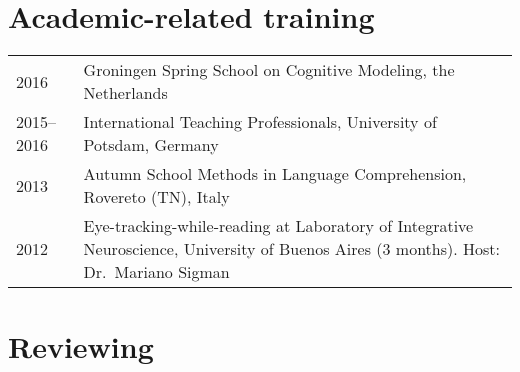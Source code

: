 \documentclass[]{article}
\begin{document}
\hypertarget{academic-related-training}{%
\section{Academic-related training}\label{academic-related-training}}

\begin{longtable}[]{@{}ll@{}}
\toprule
\endhead
\begin{minipage}[t]{0.25\columnwidth}\raggedright
2016\strut
\end{minipage} & \begin{minipage}[t]{0.69\columnwidth}\raggedright
Groningen Spring School on Cognitive Modeling, the Netherlands\strut
\end{minipage}\tabularnewline
\begin{minipage}[t]{0.25\columnwidth}\raggedright
2015--2016\strut
\end{minipage} & \begin{minipage}[t]{0.69\columnwidth}\raggedright
International Teaching Professionals, University of Potsdam,
Germany\strut
\end{minipage}\tabularnewline
\begin{minipage}[t]{0.25\columnwidth}\raggedright
2013\strut
\end{minipage} & \begin{minipage}[t]{0.69\columnwidth}\raggedright
Autumn School Methods in Language Comprehension, Rovereto (TN),
Italy\strut
\end{minipage}\tabularnewline
\begin{minipage}[t]{0.25\columnwidth}\raggedright
2012\strut
\end{minipage} & \begin{minipage}[t]{0.69\columnwidth}\raggedright
Eye-tracking-while-reading at Laboratory of Integrative Neuroscience,
University of Buenos Aires (3 months). Host: Dr.~Mariano Sigman\strut
\end{minipage}\tabularnewline
\bottomrule
\end{longtable}

\hypertarget{reviewing}{%
\section{Reviewing}\label{reviewing}}
\end{document}
